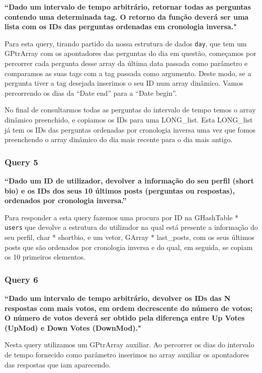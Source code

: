 \documentclass[a4paper]{article}
\begin{document}
\textbf{“Dado um intervalo de tempo arbitrário, retornar todas as perguntas contendo uma determinada tag.
O retorno da função deverá ser uma lista com os IDs das perguntas ordenadas em cronologia inversa."}

Para esta query, tirando partido da nossa estrutura de dados \texttt{day},
que tem um GPtrArray com
os apontadores das perguntas do dia em questão, começamos por percorrer cada pergunta desse array
da última data passada como parâmetro e comparamos as suas tags com a tag passada como argumento.
Deste modo, se a pergunta tiver a tag desejada inserimos o seu ID num array dinâmico.
Vamos percorrendo os dias da “Date end” para a “Date begin”.

No final de consultarmos todas as perguntas do intervalo de tempo temos o array dinâmico preenchido,
e copiamos os IDs para uma LONG\_list.
Esta LONG\_list já tem os IDs das perguntas ordenadas por cronologia inversa uma vez que
fomos preenchendo o array dinâmico do dia mais recente para o dia mais antigo.



\subsubsection*{Query 5}
\label{sec:query5}

\textbf{“Dado um ID de utilizador,  devolver a informação do
seu perfil (short bio) e os IDs dos seus 10 últimos posts (perguntas ou respostas),
ordenados por cronologia inversa.”}

Para responder a esta query fazemos uma procura por ID na GHashTable * \texttt{users} que devolve
a estrutura do utilizador na qual está presente a informação do
seu perfil, char * shortbio, e um vetor, GArray * last\_posts, com os seus últimos posts que são
ordenados por cronologia inversa e do qual, em seguida, se copiam os 10 primeiros
elementos.

\subsubsection*{Query 6}
\label{sec:query6}

\textbf{“Dado um intervalo de tempo arbitrário, devolver os IDs das N respostas
com mais votos, em ordem decrescente do número de votos; O número de votos deverá
ser obtido pela diferença entre Up Votes (UpMod) e Down Votes (DownMod)."}

Nesta query utilizamos um GPtrArray auxiliar. Ao percorrer os dias do intervalo
de tempo fornecido como parâmetro inserimos no array auxiliar os apontadores das
respostas que iam aparecendo.
\end{document}
